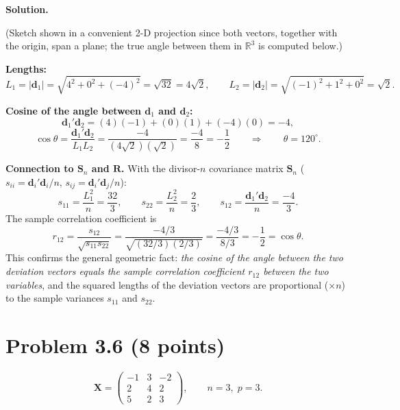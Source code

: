 \documentclass[11pt]{article}
\newcommand{\bX}{\mathbf{X}}
\newcommand{\bS}{\mathbf{S}}
\newcommand{\bd}{\mathbf{d}}
\newcommand{\bR}{\mathbf{R}}
\newenvironment{sol}{\par\noindent\textbf{Solution.}\quad}{\par\medskip}
\begin{document}
\begin{sol}
\begin{center}
\end{center}
(Sketch shown in a convenient 2-D projection since both vectors, together with the origin, span a plane; the true angle between them in $\mathbb{R}^3$ is computed below.)

\textbf{Lengths:}
\[
L_1 = |\bd_1| = \sqrt{4^2+0^2+(-4)^2} = \sqrt{32} = 4\sqrt{2}, \qquad
L_2 = |\bd_2| = \sqrt{(-1)^2+1^2+0^2} = \sqrt{2}.
\]

\textbf{Cosine of the angle between $\bd_1$ and $\bd_2$:}
\[
\bd_1'\bd_2 = (4)(-1)+(0)(1)+(-4)(0) = -4,
\]
\[
\cos\theta = \frac{\bd_1'\bd_2}{L_1 L_2} = \frac{-4}{(4\sqrt{2})(\sqrt{2})} = \frac{-4}{8} = -\frac12
\qquad\Longrightarrow\qquad \theta = 120^\circ.
\]

\textbf{Connection to $\bS_n$ and $\bR$.} With the divisor-$n$ covariance matrix $\bS_n$ ($s_{ii}=\bd_i'\bd_i/n$, $s_{ij}=\bd_i'\bd_j/n$):
\[
s_{11} = \frac{L_1^2}{n} = \frac{32}{3}, \qquad s_{22} = \frac{L_2^2}{n} = \frac{2}{3}, \qquad
s_{12} = \frac{\bd_1'\bd_2}{n} = \frac{-4}{3}.
\]
The sample correlation coefficient is
\[
r_{12} = \frac{s_{12}}{\sqrt{s_{11}s_{22}}} = \frac{-4/3}{\sqrt{(32/3)(2/3)}} = \frac{-4/3}{8/3} = -\frac12 = \cos\theta.
\]
This confirms the general geometric fact: \emph{the cosine of the angle between the two deviation vectors equals the sample correlation coefficient $r_{12}$ between the two variables}, and the squared lengths of the deviation vectors are proportional ($\times n$) to the sample variances $s_{11}$ and $s_{22}$.
\end{sol}

\clearpage
\section{Problem 3.6 (8 points)}

\[
\bX = \begin{pmatrix} -1 & 3 & -2 \\ 2 & 4 & 2 \\ 5 & 2 & 3\end{pmatrix}, \qquad n=3,\; p=3.
\]
\end{document}
